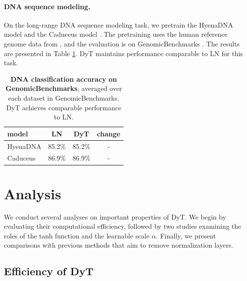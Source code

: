 \vskip -0.1in
\paragraph{DNA sequence modeling.}
On the long-range DNA sequence modeling task, we pretrain the HyenaDNA model \citep{nguyen2024hyenadna} and the Caduceus model \citep{schiff2024caduceus}. The pretraining uses the human reference genome data from \citep{grch382013p13}, and the evaluation is on GenomicBenchmarks \citep{grevsova2023genomic}. The results are presented in Table \ref{table:dna_sequence}. DyT maintains performance comparable to LN for this task.



\begin{table}[h!]
\centering
{}
\begin{tabular}{lccc}
\toprule
model &LN & DyT & change \\
\midrule
HyenaDNA \citep{nguyen2024hyenadna} & 85.2\% & 85.2\% & - \\
Caduceus \citep{schiff2024caduceus} & 86.9\% & 86.9\% & - \\
\midrule
  \end{tabular}
  \caption{\textbf{DNA classification accuracy on GenomicBenchmarks}, averaged over each dataset in GenomicBenchmarks. DyT achieves comparable performance to LN.}
  \label{table:dna_sequence}
  \vspace{-0.2in}
\end{table}





\section{Analysis}

\vspace{-0.05in}
We conduct several analyses on important properties of DyT. We begin by evaluating their computational efficiency, followed by two studies examining the roles of the tanh function and the learnable scale $\alpha$. Finally, we present comparisons with previous methods that aim to remove normalization layers.

\vspace{-0.05in}
\subsection{Efficiency of DyT}

